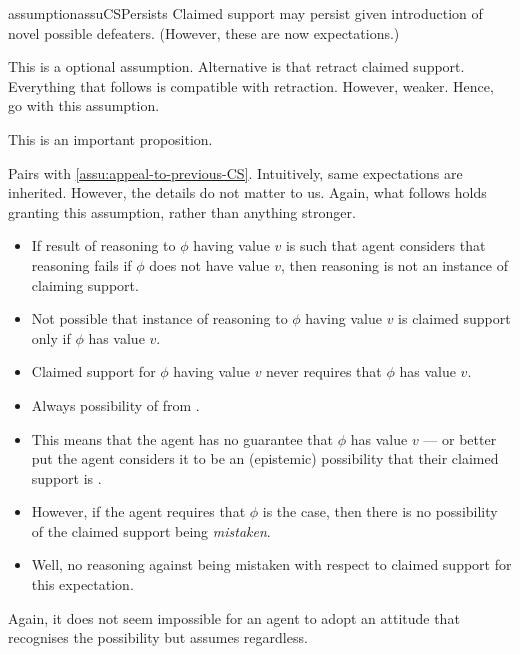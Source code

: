 \begin{note}
  \begin{restatable}{assumption}{assuCSPersists}\label{assu:CS-persists}
    Claimed support may persist given introduction of novel possible defeaters.
    (However, these are now expectations.)
  \end{restatable}

  This is a optional assumption.
  Alternative is that retract claimed support.
  Everything that follows is compatible with retraction.
  However, weaker.
  Hence, go with this assumption.
\end{note}

\begin{note}
  This is an important proposition.

  Pairs with \autoref{assu:appeal-to-previous-CS}.
  Intuitively, same expectations are inherited.
  However, the details do not matter to us.
  Again, what follows holds granting this assumption, rather than anything stronger.
\end{note}

\begin{note}
  \begin{itemize}
  \item If result of reasoning to \(\phi\) having value \(v\) is such that agent considers that reasoning fails if \(\phi\) does not have value \(v\), then reasoning is not an instance of claiming support.
  \item Not possible that instance of reasoning to \(\phi\) having value \(v\) is claimed support only if \(\phi\) has value \(v\).
  \item Claimed support for \(\phi\) having value \(v\) never requires that \(\phi\) has value \(v\).
  \end{itemize}
\end{note}



\begin{note}
  \color{red}
    \begin{itemize}
    \item Always possibility of \mom{} from \nfcs{}.
    \item This means that the agent has no guarantee that \(\phi\) has value \(v\) --- or better put the agent considers it to be an (epistemic) possibility that their claimed support is \mom{}.
    \item However, if the agent requires that \(\phi\) is the case, then there is no possibility of the claimed support being \emph{mistaken}.
    \item Well, no reasoning against being mistaken with respect to claimed support for this expectation.
  \end{itemize}

  Again, it does not seem impossible for an agent to adopt an attitude that recognises the possibility but assumes regardless.
\end{note}



